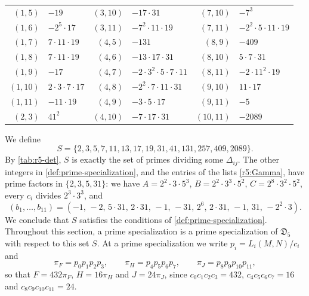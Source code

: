 \documentclass[12pt,oneside,openany]{book}
\theoremstyle{definition}
\theoremstyle{plain}
\numberwithin{equation}{chapter}
\theoremstyle{plain}
\theoremstyle{definition}
\theoremstyle{remark}
\newcommand{\datum}{\mathfrak D}
\begin{document}
\begin{table}[htbp]
\begin{tabular}{rl@{\qquad}rl@{\qquad}rl}
$(1,5)$ & $-19$ & $(3,10)$ & $-17\cdot 31$ & $(7,10)$ & $-7^{3}$ \\
$(1,6)$ & $-2^{5}\cdot 17$ & $(3,11)$ & $-7^{2}\cdot 11\cdot 19$ & $(7,11)$ & $-2^{2}\cdot 5\cdot 11\cdot 19$ \\
$(1,7)$ & $7\cdot 11\cdot 19$ & $(4,5)$ & $-131$ & $(8,9)$ & $-409$ \\
$(1,8)$ & $7\cdot 11\cdot 19$ & $(4,6)$ & $-13\cdot 17\cdot 31$ & $(8,10)$ & $5\cdot 7\cdot 31$ \\
$(1,9)$ & $-17$ & $(4,7)$ & $-2\cdot 3^{2}\cdot 5\cdot 7\cdot 11$ & $(8,11)$ & $-2\cdot 11^{2}\cdot 19$ \\
$(1,10)$ & $2\cdot 3\cdot 7\cdot 17$ & $(4,8)$ & $-2^{2}\cdot 7\cdot 11\cdot 31$ & $(9,10)$ & $11\cdot 17$ \\
$(1,11)$ & $-11\cdot 19$ & $(4,9)$ & $-3\cdot 5\cdot 17$ & $(9,11)$ & $-5$ \\
$(2,3)$ & $41^{2}$ & $(4,10)$ & $-7\cdot 17\cdot 31$ & $(10,11)$ & $-2089$ \\
\bottomrule
\end{tabular}
\end{table}

We define
\begin{equation}\label{r5:S}
S=\{2,3,5,7,11,13,17,19,31,41,131,257,409,2089\}.
\end{equation}
By \cref{tab:r5-det}, $S$ is exactly the set of primes dividing some $\Delta_{ij}$. The other integers in \cref{def:prime-specialization}, and the entries of the lists \eqref{r5:Gamma}, have prime factors in $\{2,3,5,31\}$: we have $A=2^2\cdot3\cdot5^3$, $B=2^2\cdot3^3\cdot5^2$, $C=2^8\cdot3^2\cdot5^2$, every $c_i$ divides $2^3\cdot3^3$, and
\[
(b_1,\dots,b_{11})=(-1,\,-2,\,5\cdot31,\,2\cdot31,\,-1,\,-31,\,2^6,\,2\cdot31,\,-1,\,31,\,-2^2\cdot3).
\]
We conclude that $S$ satisfies the conditions of \cref{def:prime-specialization}. Throughout this section, a prime specialization is a prime specialization of $\datum_5$ with respect to this set $S$. At a prime specialization we write $p_i=L_i(M,N)/c_i$ and
\begin{equation}\label{r5:PFHJ}
\pi_F=p_0p_1p_2p_3,\qquad \pi_H=p_4p_5p_6p_7,\qquad \pi_J=p_8p_9p_{10}p_{11},
\end{equation}
so that $F=432\pi_F$, $H=16\pi_H$ and $J=24\pi_J$, since $c_0c_1c_2c_3=432$, $c_4c_5c_6c_7=16$ and $c_8c_9c_{10}c_{11}=24$.
\end{document}
